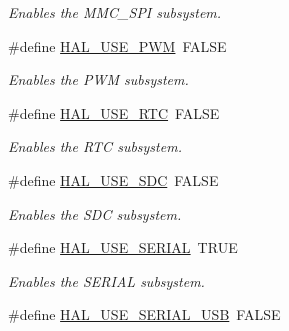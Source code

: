 \begin{DoxyCompactItemize}
\begin{DoxyCompactList}\small\item\em Enables the M\+M\+C\+\_\+\+S\+P\+I subsystem. \end{DoxyCompactList}\item 
\hypertarget{group__HAL__CONF_gafb7a560610f96b2858d51c36d65f8c2f}{}\#define \hyperlink{group__HAL__CONF_gafb7a560610f96b2858d51c36d65f8c2f}{H\+A\+L\+\_\+\+U\+S\+E\+\_\+\+P\+W\+M}~F\+A\+L\+S\+E\label{group__HAL__CONF_gafb7a560610f96b2858d51c36d65f8c2f}

\begin{DoxyCompactList}\small\item\em Enables the P\+W\+M subsystem. \end{DoxyCompactList}\item 
\hypertarget{group__HAL__CONF_ga17d20632810c9bb1601a19973977f55c}{}\#define \hyperlink{group__HAL__CONF_ga17d20632810c9bb1601a19973977f55c}{H\+A\+L\+\_\+\+U\+S\+E\+\_\+\+R\+T\+C}~F\+A\+L\+S\+E\label{group__HAL__CONF_ga17d20632810c9bb1601a19973977f55c}

\begin{DoxyCompactList}\small\item\em Enables the R\+T\+C subsystem. \end{DoxyCompactList}\item 
\hypertarget{group__HAL__CONF_ga06f315a18b911f426da736c42ab20325}{}\#define \hyperlink{group__HAL__CONF_ga06f315a18b911f426da736c42ab20325}{H\+A\+L\+\_\+\+U\+S\+E\+\_\+\+S\+D\+C}~F\+A\+L\+S\+E\label{group__HAL__CONF_ga06f315a18b911f426da736c42ab20325}

\begin{DoxyCompactList}\small\item\em Enables the S\+D\+C subsystem. \end{DoxyCompactList}\item 
\hypertarget{group__HAL__CONF_ga720d92b9c3a00d952f6f0c8665b54ebb}{}\#define \hyperlink{group__HAL__CONF_ga720d92b9c3a00d952f6f0c8665b54ebb}{H\+A\+L\+\_\+\+U\+S\+E\+\_\+\+S\+E\+R\+I\+A\+L}~T\+R\+U\+E\label{group__HAL__CONF_ga720d92b9c3a00d952f6f0c8665b54ebb}

\begin{DoxyCompactList}\small\item\em Enables the S\+E\+R\+I\+A\+L subsystem. \end{DoxyCompactList}\item 
\hypertarget{group__HAL__CONF_ga79c970fb20565143ad8b65720c0b2d0e}{}\#define \hyperlink{group__HAL__CONF_ga79c970fb20565143ad8b65720c0b2d0e}{H\+A\+L\+\_\+\+U\+S\+E\+\_\+\+S\+E\+R\+I\+A\+L\+\_\+\+U\+S\+B}~F\+A\+L\+S\+E\label{group__HAL__CONF_ga79c970fb20565143ad8b65720c0b2d0e}


\end{DoxyCompactItemize}
